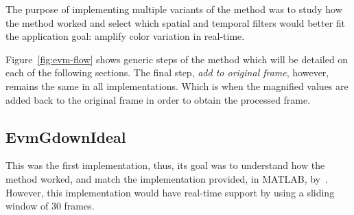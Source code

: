 The purpose of implementing multiple variants of the method was to study
how the method worked and select which spatial and temporal filters would
better fit the application goal: amplify color variation in real-time.

Figure~\ref{fig:evm-flow} shows generic steps of the method which will be
detailed on each of the following sections. The final step,
\emph{add to original frame}, however, remains the same in all
implementations. Which is when the magnified values are added back to the
original frame in order to obtain the processed frame.

\subsection{EvmGdownIdeal} \label{sec:impl:evm:gdownideal}

This was the first implementation, thus, its goal was to understand how the
method worked, and match the implementation provided, in MATLAB,
by~\cite{Wu2012Eulerian}. However, this implementation would have real-time
support by using a sliding window of $30$ frames.

